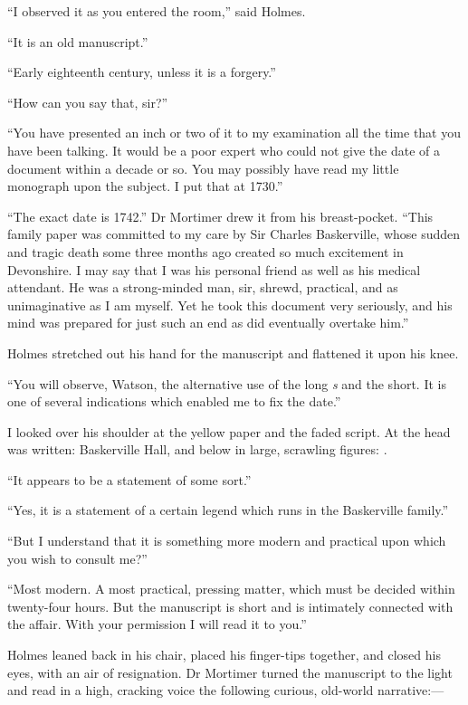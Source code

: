 \documentclass[paper=5.5in:8.5in,BCOR=7mm,twoside,DIV=calc,12pt,usegeometry,openany,chapterprefix,endperiod]{scrbook} %
\begin{document}
\enquote{I observed it as you entered the room,} said Holmes.

\enquote{It is an old manuscript.}

\enquote{Early eighteenth century, unless it is a forgery.}

\enquote{How can you say that, sir?}

\enquote{You have presented an inch or two of it to my examination all the time that you have been talking. It would be a poor expert who could not give the date of a document within a decade or so. You may possibly have read my little monograph upon the subject. I put that at 1730.}

\enquote{The exact date is 1742.} Dr Mortimer drew it from his breast-pocket. \enquote{This family paper was committed to my care by Sir Charles Baskerville, whose sudden and tragic death some three months ago created so much excitement in Devonshire. I may say that I was his personal friend as well as his medical attendant. He was a strong-minded man, sir, shrewd, practical, and as unimaginative as I am myself. Yet he took this document very seriously, and his mind was prepared for just such an end as did eventually overtake him.}

Holmes stretched out his hand for the manuscript and flattened it upon his knee.

\enquote{You will observe, Watson, the alternative use of the long \textit{s} and the short. It is one of several indications which enabled me to fix the date.}

I looked over his shoulder at the yellow paper and the faded script. At the head was written: \oldfont Baskerville Hall\normalfont, and below in large, scrawling figures: . \normalfont

\enquote{It appears to be a statement of some sort.}

\enquote{Yes, it is a statement of a certain legend which runs in the Baskerville family.}

\enquote{But I understand that it is something more modern and practical upon which you wish to consult me?}

\enquote{Most modern. A most practical, pressing matter, which must be decided within twenty-four hours. But the manuscript is short and is intimately connected with the affair. With your permission I will read it to you.}

Holmes leaned back in his chair, placed his finger-tips together, and closed his eyes, with an air of resignation. Dr Mortimer turned the manuscript to the light and read in a high, cracking voice the following curious, old-world narrative:\nobreakdash--- \\
\end{document}
